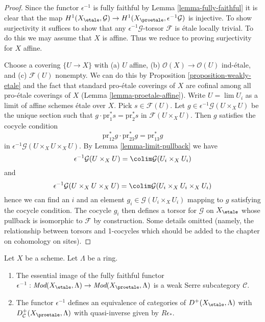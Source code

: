 \begin{proof}
Since the functor $\epsilon^{-1}$ is fully faithful by
Lemma \ref{lemma-fully-faithful}
it is clear that the map
$H^1(X_\etale, \mathcal{G}) \to H^1(X_\proetale, \epsilon^{-1}\mathcal{G})$
is injective. To show surjectivity it suffices to show that
any $\epsilon^{-1}\mathcal{G}$-torsor $\mathcal{F}$ is \'etale
locally trivial. To do this we may assume that $X$ is affine.
Thus we reduce to proving surjectivity for $X$ affine.

\medskip\noindent
Choose a covering $\{U \to X\}$ with (a) $U$ affine, (b)
$\mathcal{O}(X) \to \mathcal{O}(U)$ ind-\'etale, and (c) $\mathcal{F}(U)$
nonempty. We can do this by Proposition \ref{proposition-weakly-etale}
and the fact that
standard pro-\'etale coverings of $X$ are cofinal among all pro-\'etale
coverings of $X$ (Lemma \ref{lemma-proetale-affine}).
Write $U = \lim U_i$ as a limit of affine schemes \'etale over $X$.
Pick $s \in \mathcal{F}(U)$. Let
$g \in \epsilon^{-1}\mathcal{G}(U \times_X U)$
be the unique section such that $g \cdot \text{pr}_1^*s = \text{pr}_2^*s$ in
$\mathcal{F}(U \times_X U)$. Then $g$ satisfies the cocycle condition
$$
\text{pr}_{12}^*g \cdot \text{pr}_{23}^*g = \text{pr}_{13}^*g
$$
in $\epsilon^{-1}\mathcal{G}(U \times_X U \times_X U)$. By
Lemma \ref{lemma-limit-pullback}
we have
$$
\epsilon^{-1}\mathcal{G}(U \times_X U) =
\colim \mathcal{G}(U_i \times_X U_i)
$$
and
$$
\epsilon^{-1}\mathcal{G}(U \times_X U \times_X U) =
\colim \mathcal{G}(U_i \times_X U_i \times_X U_i)
$$
hence we can find an $i$ and an element $g_i \in \mathcal{G}(U_i \times_X U_i)$
mapping to $g$ satisfying the cocycle condition.
The cocycle $g_i$ then defines a torsor for $\mathcal{G}$ on
$X_\etale$ whose pullback is isomorphic to $\mathcal{F}$
by construction. Some details omitted (namely, the relationship
between torsors and 1-cocycles which should be added to the chapter
on cohomology on sites).
\end{proof}

\begin{lemma}
\label{lemma-compare-derived}
Let $X$ be a scheme. Let $\Lambda$ be a ring.
\begin{enumerate}
\item The essential image of the fully faithful functor
$\epsilon^{-1} : \textit{Mod}(X_\etale, \Lambda) \to
\textit{Mod}(X_\proetale, \Lambda)$
is a weak Serre subcategory $\mathcal{C}$.
\item The functor $\epsilon^{-1}$ defines an equivalence of categories
of $D^+(X_\etale, \Lambda)$ with $D^+_\mathcal{C}(X_\proetale, \Lambda)$
with quasi-inverse given by $R\epsilon_*$.
\end{enumerate}
\end{lemma}


